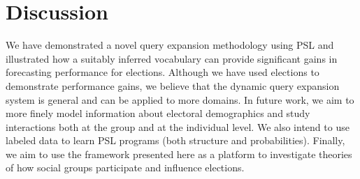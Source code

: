 \section{Discussion}
We have demonstrated a novel query expansion methodology using PSL and illustrated how a suitably
inferred vocabulary can provide significant gains in forecasting performance for elections.
Although
we have used elections to demonstrate performance gains, we believe that the
dynamic query expansion system is general and can be applied to more domains.
In future work, we aim to more finely model information about electoral demographics and study
interactions both at the group and at the individual level. We also intend to use labeled data to learn
PSL programs (both structure and probabilities). Finally, we aim to use the framework presented
here as a platform to investigate theories of how social groups participate and influence elections.

